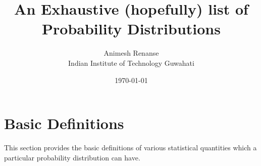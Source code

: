 \documentclass[12pt, a4paper, titlepage]{article}
\title{An Exhaustive (hopefully) list of Probability Distributions}
\author{Animesh Renanse \\
	Indian Institute of Technology Guwahati \\
	}
\date{\today}
\begin{document}
\maketitle
\newpage



\section{Basic Definitions}
This section provides the basic definitions of various statistical quantities which a particular probability distribution can have.
\end{document}
